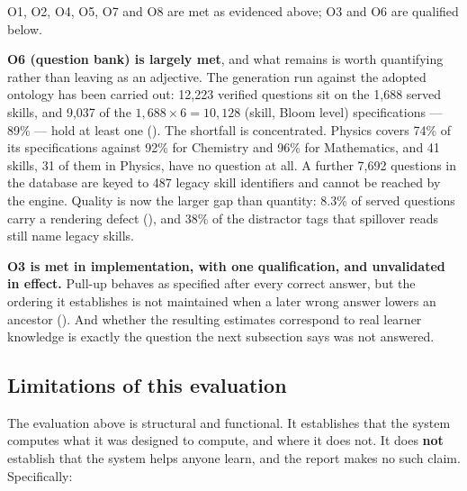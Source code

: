 O1, O2, O4, O5, O7 and O8 are met as evidenced above; O3 and O6 are qualified
below.

\textbf{O6 (question bank) is largely met}, and what remains is worth
quantifying rather than leaving as an adjective. The generation run against the
adopted ontology has been carried out: 12{,}223 verified questions sit on the
1{,}688 served skills, and 9{,}037 of the $1{,}688 \times 6 = 10{,}128$
(skill, Bloom level) specifications --- 89\% --- hold at least one
(). The shortfall is concentrated. Physics covers 74\% of
its specifications against 92\% for Chemistry and 96\% for Mathematics, and 41
skills, 31 of them in Physics, have no question at all. A further 7{,}692
questions in the database are keyed to 487 legacy skill identifiers and cannot
be reached by the engine. Quality is now the larger gap than quantity: 8.3\% of
served questions carry a rendering defect (), and 38\%
of the distractor tags that spillover reads still name legacy skills.

\textbf{O3 is met in implementation, with one qualification, and unvalidated in
effect.} Pull-up behaves as specified after every correct answer, but the
ordering it establishes is not maintained when a later wrong answer lowers an
ancestor (). And whether the resulting estimates correspond
to real learner knowledge is exactly the question the next subsection says was
not answered.

\subsection{Limitations of this evaluation}
\label{sec:eval-limits}

The evaluation above is structural and functional. It establishes that the
system computes what it was designed to compute, and where it does not. It
does \textbf{not} establish that the system helps anyone learn, and the report
makes no such claim. Specifically:

